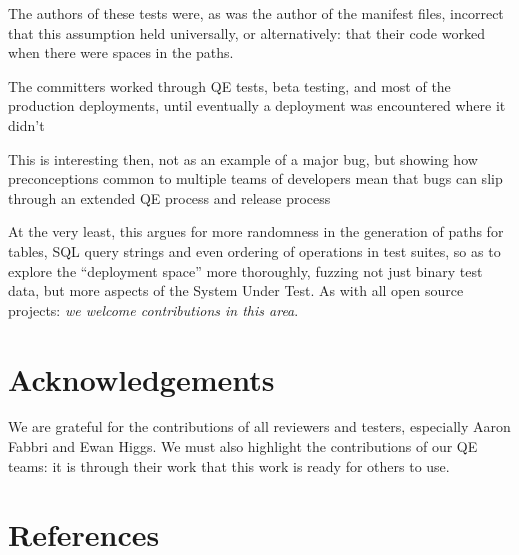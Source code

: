 \documentclass[conference]{IEEEtran}
\begin{document}
The authors of these tests were, as was the author of the manifest files, incorrect that this assumption held universally, or alternatively: that their code worked when there were spaces in the paths.

The committers worked through QE tests, beta testing, and most of the production deployments, until eventually
a deployment was encountered where it didn't

This is interesting then, not as an example of a major bug, but showing how
preconceptions common to multiple teams of developers mean that bugs
can slip through an extended QE process and release process


At the very least, this argues for more randomness in the generation
of paths for tables, SQL query strings and even ordering of
operations in test suites, so as to explore the ``deployment space''
more thoroughly, fuzzing not just binary test data, but more aspects of the System Under Test.
As with all open source projects: \emph{we welcome contributions in this area}.


\section*{Acknowledgements}
\label{sec:acknowledgements}

We are grateful for the contributions of all reviewers and testers, especially
Aaron Fabbri and Ewan Higgs.
We must also highlight the contributions of our QE teams: it is through
their work that this work is ready for others to use.


\section{References}
\label{sec:references}




\end{document}
